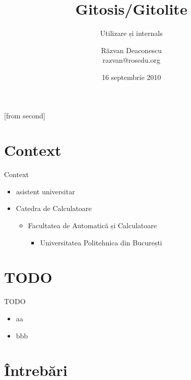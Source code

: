 \documentclass{beamer}
\title[Gitosis/Gitolite]{Gitosis/Gitolite}
\subtitle{Utilizare și internals}
\institute{Întâlnirile lunare RLUG -- Septembrie 2010}
\author[Răzvan Deaconescu]{Răzvan Deaconescu\\
	razvan@rosedu.org}
\date{16 septembrie 2010}
\begin{document}
[from second]


\frame{\titlepage}

\section{Context}

\begin{frame}{Context}
	\begin{itemize}		%
		\item asistent universitar
		\item Catedra de Calculatoare
			\begin{itemize}
				\item Facultatea de Automatică și Calculatoare
					\begin{itemize}
						\item Universitatea Politehnica din București
					\end{itemize}
			\end{itemize}
	\end{itemize}
\end{frame}

\frame{\tableofcontents}

\section{TODO}

\frame{\tableofcontents[currentsection]}

\begin{frame}{TODO}
	\begin{itemize}
		\item aa
		\item bbb
	\end{itemize}
\end{frame}

\section{Întrebări}

\frame{\tableofcontents[currentsection]}
\end{document}

